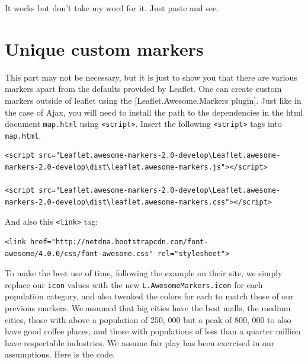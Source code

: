 \documentclass[
]{book}
\begin{document}
It works but don't take my word for it. Just paste and see.

\hypertarget{unique-custom-markers}{%
\section{Unique custom markers}\label{unique-custom-markers}}

This part may not be necessary, but it is just to show you that there are various markers apart from the defaults provided by Leaflet. One can create custom markers outside of leaflet using the {[}Leaflet.Awesome.Markers plugin{]}. Just like in the case of Ajax, you will need to install the path to the dependencies in the html document \texttt{map.html} using \texttt{\textless{}script\textgreater{}}. Insert the following \texttt{\textless{}script\textgreater{}} tags into \texttt{map.html}.

\begin{verbatim}
<script src="Leaflet.awesome-markers-2.0-develop\Leaflet.awesome-markers-2.0-develop\dist\leaflet.awesome-markers.js"></script>

<script src="Leaflet.awesome-markers-2.0-develop\Leaflet.awesome-markers-2.0-develop\dist\leaflet.awesome-markers.css"></script>
\end{verbatim}

And also this \texttt{\textless{}link\textgreater{}} tag:

\begin{verbatim}
<link href="http://netdna.bootstrapcdn.com/font-awesome/4.0.0/css/font-awesome.css" rel="stylesheet"> 
\end{verbatim}

To make the best use of time, following the example on their site, we simply replace our \texttt{icon} values with the new \texttt{L.AwesomeMarkers.icon} for each population category, and also tweaked the colors for each to match those of our previous markers. We assumed that big cities have the best malls, the medium cities, those with above a population of 250, 000 but a peak of 800, 000 to also have good coffee places, and those with populations of less than a quarter million have respectable industries. We assume fair play has been exercised in our assumptions. Here is the code.
\end{document}
